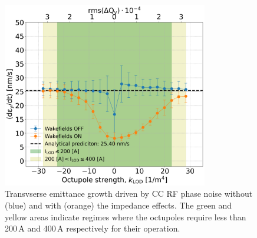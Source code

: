 \begin{figure}[!h] %
   \centering         
   \includegraphics[width=0.8\textwidth]{images/Ch8/deyRates_sps_270GeV_PN1e-8_400MHz_SPS_NewWakesAllcontributions_appendWakes_y-plane_WakesONvsOFF_QpxQpy1_6D_Nb5e5_intensity3e10Scan_vs_TuneSpreadvsExpectedSPS_octupole_current.png}
       \caption{Transvserse emittance growth driven by CC RF phase noise without (blue) and with (orange) the impedance effects. The green and yellow areas indicate regimes where the octupoles require less than 200\,A and 400\,A respectively for their operation.}
       \label{fig:pyheadtail_cc_impedance_2022_md_octupole_current}
\end{figure}

